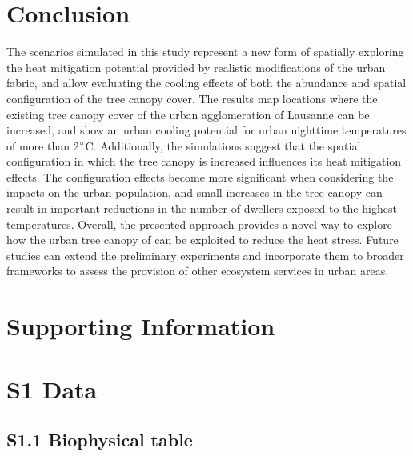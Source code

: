 \documentclass[10pt,letterpaper]{article}
\begin{document}
\section*{Conclusion}
The scenarios simulated in this study represent a new form of spatially exploring the heat mitigation potential provided by realistic modifications of the urban fabric, and allow evaluating the cooling effects of both the abundance and spatial configuration of the tree canopy cover.
The results map locations where the existing tree canopy cover of the urban agglomeration of Lausanne can be increased, and show an urban cooling potential for urban nighttime temperatures of more than 2$\degree$C.
Additionally, the simulations suggest that the spatial configuration in which the tree canopy is increased influences its heat mitigation effects.
The configuration effects become more significant when considering the impacts on the urban population, and small increases in the tree canopy can result in important reductions in the number of dwellers exposed to the highest temperatures.
Overall, the presented approach provides a novel way to explore how the urban tree canopy of can be exploited to reduce the heat stress.
Future studies can extend the preliminary experiments and incorporate them to broader frameworks to assess the provision of other ecosystem services in urban areas.


\section*{Supporting Information}

\setcounter{figure}{0}
\renewcommand{\thefigure}{S\arabic{figure}}
\setcounter{table}{0}
\renewcommand{\thetable}{S\arabic{table}}

\section*{S1 Data}

\subsection*{S1.1 Biophysical table}
\label{sec:si-biophysical-table}
\end{document}
